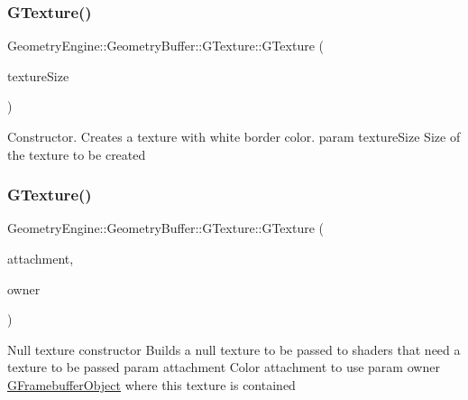\subsubsection{\texorpdfstring{GTexture()}{GTexture()}\hspace{0.1cm}{\footnotesize\ttfamily [3/6]}}
{\footnotesize\ttfamily Geometry\+Engine\+::\+Geometry\+Buffer\+::\+G\+Texture\+::\+G\+Texture (\begin{DoxyParamCaption}\item[{const Q\+Vector2D \&}]{texture\+Size }\end{DoxyParamCaption})}

Constructor. Creates a texture with white border color. param texture\+Size Size of the texture to be created \mbox{\label{class_geometry_engine_1_1_geometry_buffer_1_1_g_texture_add6fc3854f8fe8996fcd29de07d05646}} 
\subsubsection{\texorpdfstring{GTexture()}{GTexture()}\hspace{0.1cm}{\footnotesize\ttfamily [4/6]}}
{\footnotesize\ttfamily Geometry\+Engine\+::\+Geometry\+Buffer\+::\+G\+Texture\+::\+G\+Texture (\begin{DoxyParamCaption}\item[{G\+Framebuffer\+Commons\+::\+G\+\_\+\+C\+O\+L\+O\+R\+\_\+\+A\+T\+T\+A\+C\+H\+M\+E\+N\+TS}]{attachment,  }\item[{const \mbox{\hyperlink{class_geometry_engine_1_1_geometry_buffer_1_1_g_framebuffer_object}{G\+Framebuffer\+Object}} $\ast$}]{owner }\end{DoxyParamCaption})}

Null texture constructor Builds a null texture to be passed to shaders that need a texture to be passed param attachment Color attachment to use param owner \mbox{\hyperlink{class_geometry_engine_1_1_geometry_buffer_1_1_g_framebuffer_object}{G\+Framebuffer\+Object}} where this texture is contained \mbox{\label{class_geometry_engine_1_1_geometry_buffer_1_1_g_texture_acfb10448d13cf57f11ed8a80b2a620dd}} 
